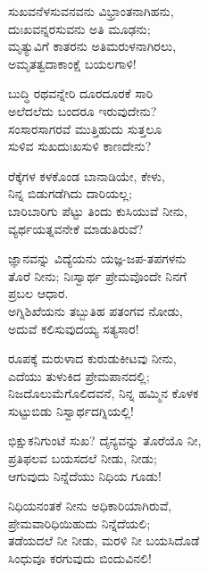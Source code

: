 \begin{myquote}
ಸುಖವನೆಳಸುವನವನು ವಿಭ್ರಾಂತನಾಗಿಹನು,\\ದುಃಖವನ್ನರಸುವನು ಅತಿ ಮೂಢನು;\\ಮೃತ್ಯುವಿಗೆ ಕಾತರನು ಅತಿಮರುಳನಾಗಿರಲು,\\ಅಮೃತತ್ವದಾಕಾಂಕ್ಷೆ ಬಯಲಗಾಳಿ!
\end{myquote}

\begin{myquote}
ಬುದ್ಧಿ ರಥವನ್ನೇರಿ ದೂರದೂರಕೆ ಸಾರಿ\\ಅಲೆದಲೆದು ಬಂದರೂ ಇರುವುದೇನು?\\ಸಂಸಾರಸಾಗರವೆ ಮುತ್ತಿಹುದು ಸುತ್ತಲೂ\\ಸುಳಿವ ಸುಖದುಃಖಸುಳಿ ಕಾಣದೇನು?
\end{myquote}

\begin{myquote}
ರೆಕ್ಕೆಗಳ ಕಳಕೊಂಡ ಬಾನಾಡಿಯೇ, ಕೇಳು,\\ನಿನ್ನ ಬಿಡುಗಡೆಗಿದು ದಾರಿಯಲ್ಲ;\\ಬಾರಿಬಾರಿಗು ಪೆಟ್ಟು ತಿಂದು ಕುಸಿಯುವೆ ನೀನು,\\ವ್ಯರ್ಥಯತ್ನವನೇಕೆ ಮಾಡುತಿರುವೆ?
\end{myquote}

\begin{myquote}
ಜ್ಞಾನವನ್ನು ವಿದ್ಯೆಯನು ಯಜ್ಞ-ಜಪ-ತಪಗಳನು\\ತೊರೆ ನೀನು; ನಿಃಸ್ವಾರ್ಥ ಪ್ರೇಮವೊಂದೇ ನಿನಗೆ\\ಪ್ರಬಲ ಆಧಾರ.\\ಅಗ್ನಿಶಿಖೆಯನು ತಬ್ಬುತಿಹ ಪತಂಗವ ನೋಡು,\\ಅದುವೆ ಕಲಿಸುವುದಯ್ಯ ಸತ್ಯಸಾರ!
\end{myquote}

\begin{myquote}
ರೂಪಕ್ಕೆ ಮರುಳಾದ ಕುರುಡುಕೀಟವು ನೀನು,\\ಎದೆಯು ತುಳುಕಿದ ಪ್ರೇಮಪಾನದಲ್ಲಿ;\\ನಿಜದೊಲುಮೆಗೊಲಿದವನೆ, ನಿನ್ನ ಹಮ್ಮಿನ ಕೊಳಕ\\ಸುಟ್ಟುಬಿಡು ನಿಸ್ವಾರ್ಥದಗ್ನಿಯಲ್ಲಿ!
\end{myquote}

\begin{myquote}
ಭಿಕ್ಷುಕನಿಗುಂಟೆ ಸುಖ? ದೈನ್ಯವನ್ನು ತೊರೆಯೊ ನೀ,\\ಪ್ರತಿಫಲವ ಬಯಸದಲೆ ನೀಡು, ನೀಡು;\\ಆಗುವುದು ನಿನ್ನೆದೆಯು ನಿಧಿಯ ಗೂಡು!
\end{myquote}

\begin{myquote}
ನಿಧಿಯನಂತಕೆ ನೀನು ಅಧಿಕಾರಿಯಾಗಿರುವೆ,\\ಪ್ರೇಮವಾರಿಧಿಯಿಹುದು ನಿನ್ನೆದೆಯಲಿ;\\ತಡೆಯದಲೆ ನೀ ನೀಡು, ಮರಳಿ ನೀ ಬಯಸಿದೊಡೆ\\ಸಿಂಧುವೂ ಕರಗುವುದು ಬಿಂದುವಿನಲಿ!
\end{myquote}

